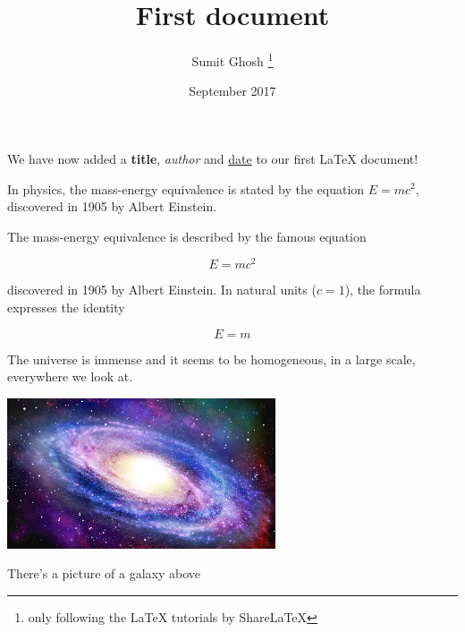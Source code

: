 \documentclass[12pt, letterpaper]{article}
\title{First document}
\author{Sumit Ghosh \thanks{only following the LaTeX tutorials by ShareLaTeX}}
\date{September 2017}
\begin{document}
\maketitle

We have now added a \textbf{title}, \textit{author} and \underline{date} to our first \LaTeX{} document!

In physics, the mass-energy equivalence is stated by the equation $E=mc^2$, discovered in 1905 by Albert Einstein.

The mass-energy equivalence is described by the famous equation

$$E=mc^2$$

discovered in 1905 by Albert Einstein.
In natural units ($c=1$), the formula expresses the identity

\begin{equation}
E=m
\end{equation}

The universe is immense and it seems to be homogeneous, in a large scale, everywhere we look at.

\includegraphics{galaxy}

There's a picture of a galaxy above
\end{document}
